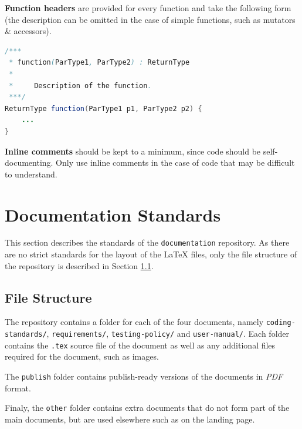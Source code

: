 \documentclass{article}
\begin{document}
    \textbf{Function headers} are provided for every function and take the
    following form (the description can be omitted in the case of simple
    functions, such as mutators \& accessors).

    \begin{lstlisting}[language=Java]
/***
 * function(ParType1, ParType2) : ReturnType
 *
 *     Description of the function.
 ***/
ReturnType function(ParType1 p1, ParType2 p2) {
    ...
}
    \end{lstlisting}

    \textbf{Inline comments} should be kept to a minimum, since code should be
    self-documenting. Only use inline comments in the case of code that may be
    difficult to understand.

    \newpage


    \section{Documentation Standards}
    \label{sec:documentation}

    This section describes the standards of the \texttt{documentation}
    repository. As there are no strict standards for the layout of the \LaTeX
    files, only the file structure of the repository is described in Section
    \ref{sec:doc-struc}.

    \subsection{File Structure}
    \label{sec:doc-struc}

    The repository contains a folder for each of the four documents, namely
    \texttt{coding-standards/}, \texttt{requirements/}, \texttt{testing-policy/}
    and \texttt{user-manual/}. Each folder contains the \texttt{.tex} source
    file of the document as well as any additional files required for the
    document, such as images.

    The \texttt{publish} folder contains publish-ready versions of the documents
    in \textit{PDF} format.

    Finaly, the \texttt{other} folder contains extra documents that do not form
    part of the main documents, but are used elsewhere such as on the landing
    page.

    \newpage

\end{document}
